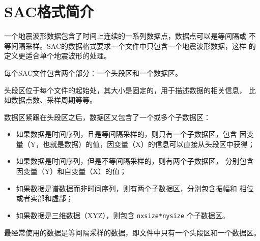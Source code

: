\section{SAC格式简介}
一个地震波形数据包含了时间上连续的一系列数据点，数据点可以是等间隔或
不等间隔采样。SAC的数据格式要求一个文件中只包含一个地震波形数据，这样
的定义更适合单个地震波形的处理。

每个SAC文件包含两个部分：一个头段区和一个数据区。

头段区位于每个文件的起始处，其大小是固定的，用于描述数据的相关信息，
比如数据点数、采样周期等等。

数据区紧跟在头段区之后，数据区又包含了一个或多个子数据区：
\begin{itemize}
\item 如果数据是时间序列，且是等间隔采样的，则只有一个子数据区，包含
    因变量（Y，也就是数据）的值，因变量（X）的信息可以直接从头段区中获得；
\item 如果数据是时间序列，但是不等间隔采样的，则有两个子数据区，
    分别包含因变量（Y）和自变量（X）的值；
\item 如果数据是谱数据而非时间序列，则有两个子数据区，分别包含振幅和
    相位或者实部和虚部；
\item 如果数据是三维数据（XYZ），则包含 \texttt{nxsize*nysize} 个子数据区。
\end{itemize}
最经常使用的数据是等间隔采样的数据，即文件中只有一个头段区和一个数据区。
